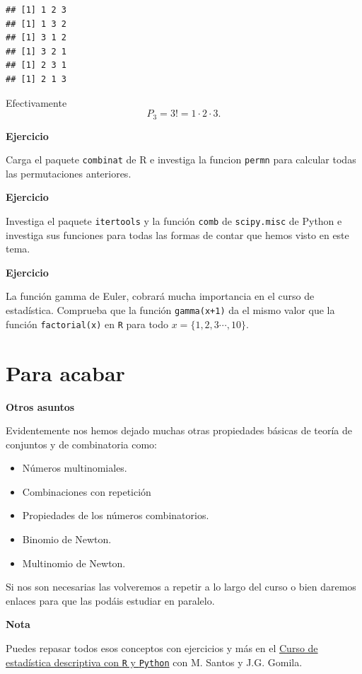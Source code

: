 \documentclass[]{book}
\providecommand{\tightlist}{%
  \setlength{\itemsep}{0pt}\setlength{\parskip}{0pt}}
\begin{document}
\begin{verbatim}
## [1] 1 2 3
## [1] 1 3 2
## [1] 3 1 2
## [1] 3 2 1
## [1] 2 3 1
## [1] 2 1 3
\end{verbatim}

Efectivamente
\[
P_3=3!=1\cdot  2\cdot 3.
\]

\textbf{Ejercicio}

Carga el paquete \texttt{combinat} de R e investiga la funcion \texttt{permn} para calcular todas las permutaciones anteriores.

\textbf{Ejercicio}

Investiga el paquete \texttt{itertools} y la función \texttt{comb} de \texttt{scipy.misc} de Python e investiga sus funciones para todas las formas de contar que hemos visto en este tema.

\textbf{Ejercicio}

La función gamma de Euler, cobrará mucha importancia en el curso de estadística. Comprueba que la función \texttt{gamma(x+1)} da el mismo valor que la función \texttt{factorial(x)} en \texttt{R} para todo \(x = \{1,2,3\cdots,10\}\).

\hypertarget{para-acabar}{%
\section{Para acabar}\label{para-acabar}}

\textbf{Otros asuntos}

Evidentemente nos hemos dejado muchas otras propiedades básicas de teoría de conjuntos y de combinatoria como:

\begin{itemize}
\tightlist
\item
  Números multinomiales.
\item
  Combinaciones con repetición
\item
  Propiedades de los números combinatorios.
\item
  Binomio de Newton.
\item
  Multinomio de Newton.
\end{itemize}

Si nos son necesarias las volveremos a repetir a lo largo del curso o bien daremos enlaces para que las podáis estudiar en paralelo.

\textbf{Nota}

Puedes repasar todos esos conceptos con ejercicios y más en el \href{https://www.udemy.com/course/estadistica-descriptiva?couponCode=JB_PROMO_OFF}{Curso de estadística descriptiva con \texttt{R} y \texttt{Python}} con M. Santos y J.G. Gomila.
\end{document}

